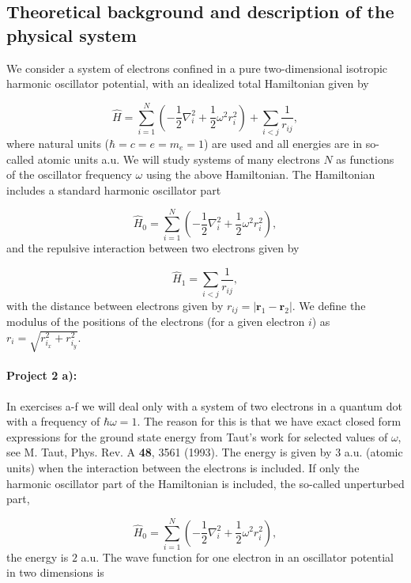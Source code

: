 \documentclass[%
oneside,                 %
final,                   %
10pt]{article}
\begin{document}
\subsection*{Theoretical background and description of the physical system}

We consider a system of electrons confined in a pure two-dimensional 
isotropic harmonic oscillator potential, with an idealized  total Hamiltonian given by

\begin{equation}
\label{eq:finalH}
\hat{H}=\sum_{i=1}^{N} \left(  -\frac{1}{2} \nabla_i^2 + \frac{1}{2} \omega^2r_i^2  \right)+\sum_{i<j}\frac{1}{r_{ij}},
\end{equation}
where natural units ($\hbar=c=e=m_e=1$) are used and all energies are in so-called atomic units a.u. We will study systems of many electrons $N$ as functions of the oscillator frequency  $\omega$ using the above Hamiltonian.  The Hamiltonian includes a standard harmonic oscillator part

\begin{equation*}
\hat{H}_0=\sum_{i=1}^{N} \left(  -\frac{1}{2} \nabla_i^2 + \frac{1}{2} \omega^2r_i^2  \right),
\end{equation*}
and the repulsive interaction between two electrons given by

\begin{equation*}
\hat{H}_1=\sum_{i<j}\frac{1}{r_{ij}},
\end{equation*}
with the distance between electrons given by $r_{ij}=\vert \bm{r}_1-\bm{r}_2\vert$. We define the 
modulus of the positions of the electrons (for a given electron $i$) as $r_i = \sqrt{r_{i_x}^2+r_{i_y}^2}$.

\paragraph{Project 2 a):}
In exercises a-f we will deal only with a system of
two electrons in a quantum dot with a frequency of $\hbar\omega = 1$. 
The reason for this is that we have exact closed form expressions 
for the ground state energy from Taut's work for selected values of $\omega$, 
see M. Taut, Phys. Rev. A \textbf{48}, 3561 (1993).
The energy is given by $3$ a.u.  (atomic units) when the interaction between the electrons is included.
If only the harmonic oscillator part of the Hamiltonian is included,
the so-called unperturbed part,

\begin{equation*} \hat{H}_0=\sum_{i=1}^{N} \left(  -\frac{1}{2} \nabla_i^2 + \frac{1}{2} \omega^2r_i^2  \right),\end{equation*}
the energy is $2$ a.u.
The wave function for one electron in an oscillator potential in two dimensions is
\end{document}
